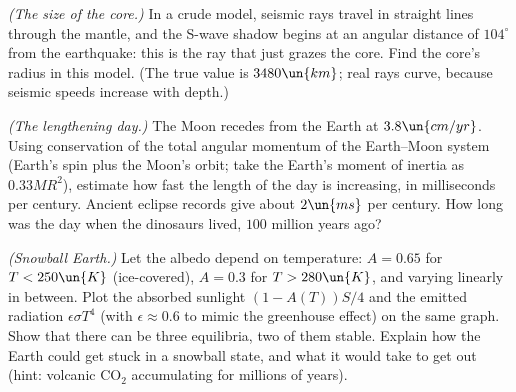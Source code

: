 \begin{problems}
\core \label{prob:core-shadow} \emph{(The size of the core.)} In a crude model, seismic rays travel in straight lines through the mantle, and the S-wave shadow begins at an angular distance of $104^\circ$ from the earthquake: this is the ray that just grazes the core. Find the core's radius in this model. (The true value is $3480\un{km}$; real rays curve, because seismic speeds increase with depth.)

 \label{prob:day-length} \emph{(The lengthening day.)} The Moon recedes from the Earth at $3.8\un{cm/yr}$. Using conservation of the total angular momentum of the Earth--Moon system (Earth's spin plus the Moon's orbit; take the Earth's moment of inertia as $0.33MR^2$), estimate how fast the length of the day is increasing, in milliseconds per century. Ancient eclipse records give about $2\un{ms}$ per century. How long was the day when the dinosaurs lived, $100$ million years ago?

 \label{prob:snowball} \emph{(Snowball Earth.)} Let the albedo depend on temperature: $A = 0.65$ for $T<250\un{K}$ (ice-covered), $A = 0.3$ for $T>280\un{K}$, and varying linearly in between. Plot the absorbed sunlight $(1-A(T))S/4$ and the emitted radiation $\epsilon\sigma T^4$ (with $\epsilon\approx0.6$ to mimic the greenhouse effect) on the same graph. Show that there can be three equilibria, two of them stable. Explain how the Earth could get stuck in a snowball state, and what it would take to get out (hint: volcanic CO$_2$ accumulating for millions of years).
\end{problems}

\begin{reading}
\end{reading}
